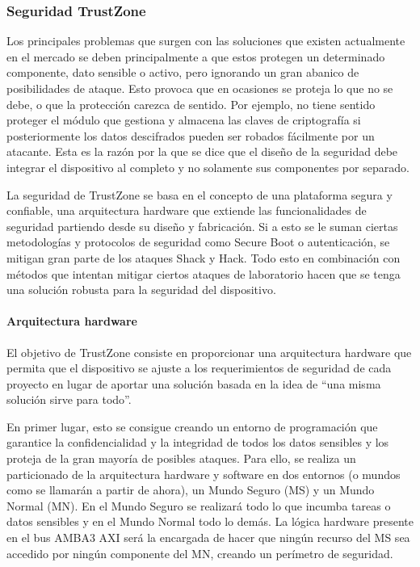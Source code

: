 \subsubsection{Seguridad TrustZone}

Los principales problemas que surgen con las soluciones que existen actualmente en el mercado se deben principalmente a que estos protegen un determinado componente, dato sensible o activo, pero ignorando un gran abanico de posibilidades de ataque. Esto provoca que en ocasiones se proteja lo que no se debe, o que la protección carezca de sentido. Por ejemplo, no tiene sentido proteger el módulo que gestiona y almacena las claves de criptografía si posteriormente los datos descifrados pueden ser robados fácilmente por un atacante. Esta es la razón por la que se dice que el diseño de la seguridad debe integrar el dispositivo al completo y no solamente sus componentes por separado. \newline

La seguridad de TrustZone se basa en el concepto de una plataforma segura y confiable, una arquitectura hardware que extiende las funcionalidades de seguridad partiendo desde su diseño y fabricación. Si a esto se le suman ciertas metodologías y protocolos de seguridad como Secure Boot o autenticación, se mitigan gran parte de los ataques Shack y Hack. Todo esto en combinación con métodos que intentan mitigar ciertos ataques de laboratorio hacen que se tenga una solución robusta para la seguridad del dispositivo.

\paragraph{Arquitectura hardware}
El objetivo de TrustZone consiste en proporcionar una arquitectura hardware que permita que el dispositivo se ajuste a los requerimientos de seguridad de cada proyecto en lugar de aportar una solución basada en la idea de “una misma solución sirve para todo”. \newline

En primer lugar, esto se consigue creando un entorno de programación que garantice la confidencialidad y la integridad de todos los datos sensibles y los proteja de la gran mayoría de posibles ataques. Para ello, se realiza un particionado de la arquitectura hardware y software en dos entornos (o mundos como se llamarán a partir de ahora), un Mundo Seguro (MS) y un Mundo Normal (MN). En el Mundo Seguro se realizará todo lo que incumba tareas o datos sensibles y en el Mundo Normal todo lo demás. La lógica hardware presente en el bus AMBA3 AXI será la encargada de hacer que ningún recurso del MS sea accedido por ningún componente del MN, creando un perímetro de seguridad. \newline


